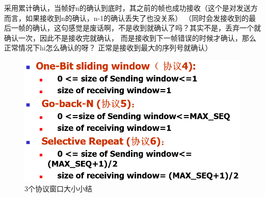 \documentclass[UTF8,a4paper]{ctexart}
\begin{document}
采用累计确认，当帧好n的确认到底时，其之前的帧也成功接收（这个是对发送方而言，如果接收到n的确认，n-1的确认丢失了也没关系）
（同时会发接收到的最后一帧的确认，这句感觉是废话啊，不是收到就确认了吗？其实不是，丢弃一个就确认一次，因此不是接收完就确认，
而是接收到下一帧错误的时候才确认，那么正常情况下hi怎么确认的呀？
正常是接收到最大的序列号就确认）

\begin{figure}[H]
  \centering
  \includegraphics[scale = 0.3]{assets/jisuanjiwangluo_3b720.png}
  \caption{3个协议窗口大小小结}
\end{figure}
\end{document}
